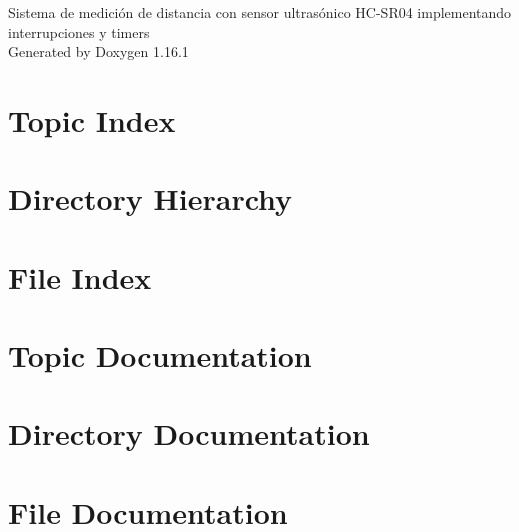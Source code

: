 \documentclass[twoside]{book}
\newcommand{\+}{\discretionary{\mbox{\scriptsize$\hookleftarrow$}}{}{}}
\newcommand{\clearemptydoublepage}{%
    \newpage{\pagestyle{empty}\cleardoublepage}%
  }
\begin{document}
  \raggedbottom
    \hypersetup{pageanchor=false,
                bookmarksnumbered=true,
                pdfencoding=unicode
               }
  \begin{titlepage}
  \vspace*{7cm}
  \begin{center}%
  {\Large Sistema de medición de distancia con sensor ultrasónico HC-\/\+SR04 implementando interrupciones y timers}\\
  \vspace*{1cm}
  {\large Generated by Doxygen 1.16.1}\\
  \end{center}
  \end{titlepage}
  \clearemptydoublepage
  \tableofcontents
  \clearemptydoublepage
  \hypersetup{pageanchor=true}

\chapter{Topic Index}

\chapter{Directory Hierarchy}

\chapter{File Index}

\chapter{Topic Documentation}

\chapter{Directory Documentation}




\chapter{File Documentation}

  \backmatter
  \newpage
  \clearemptydoublepage
  \printindex
\end{document}
